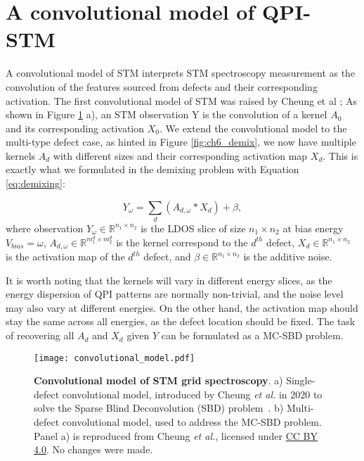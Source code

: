 \section{A convolutional model of QPI-STM}
A convolutional model of STM interprets STM spectroscopy measurement as the convolution of the features sourced from defects and their corresponding activation. The first convolutional model of STM was raised by Cheung et al \cite{cheungDictionaryLearningFouriertransform2020}; As shown in Figure \ref{fig:ch6_conv} a), an STM observation Y is the convolution of a kernel $A_0$ and its corresponding activation $X_0$. We extend the convolutional model to the multi-type defect case, as hinted in Figure \ref{fig:ch6_demix}, we now have multiple kernels $A_d$ with different sizes and their corresponding activation map $X_d$. This is exactly what we formulated in the demixing problem with Equation \ref{eq:demixing}:

\begin{equation}
	Y_{\omega} = \sum_d ( A_{d,{\omega}} * X_d) + \beta,
\end{equation}
\noindent where observation $Y_{\omega} \in \mathbb{R}^{n_1 \times n_2}$ is the \ac{LDOS} slice of size $n_1 \times n_2$ at bias energy $V_{bias} = \omega$, $A_{d,{\omega}} \in \mathbb{R}^{m_1^d \times m_2^d}$ is the kernel correspond to the $d^{th}$ defect, $X_{d} \in \mathbb{R}^{n_1 \times n_2}$ is the activation map of the $d^{th}$ defect, and $\beta \in \mathbb{R}^{n_1 \times n_2}$ is the additive noise. 

\noindent It is worth noting that the kernels will vary in different energy slices, as the energy dispersion of QPI patterns are normally non-trivial, and the noise level may also vary at different energies. On the other hand, the activation map should stay the same across all energies, as the defect location should be fixed. The task of recovering all $A_d$ and $X_d$ given $Y$ can be formulated as a \ac{MC-SBD} problem. 
 
\begin{figure}
	\texttt{[image: convolutional\_model.pdf]} 
	\centering
	\caption[\textbf{Convolutional model of STM grid spectroscopy}]{\textbf{Convolutional model of STM grid spectroscopy}. a) Single-defect convolutional model, introduced by Cheung \textit{et al.} in 2020 to solve the Sparse Blind Deconvolution (SBD) problem~. 
		b) Multi-defect convolutional model, used to address the \ac{MC-SBD} problem. 
		Panel a) is reproduced from Cheung \textit{et al.}\cite{cheungDictionaryLearningFouriertransform2020}, licensed under 
		\href{http://creativecommons.org/licenses/by/4.0/}{CC BY 4.0}. 
		No changes were made.}
	\label{fig:ch6_conv}
\end{figure}


